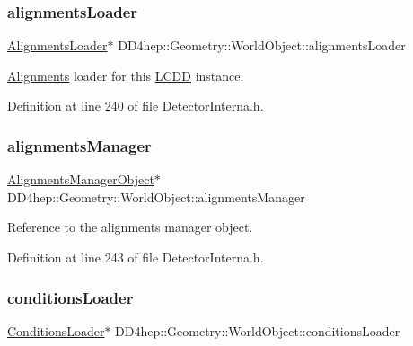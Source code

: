 \subsubsection{\texorpdfstring{alignments\+Loader}{alignmentsLoader}}
{\footnotesize\ttfamily \hyperlink{class_d_d4hep_1_1_geometry_1_1_world_object_a30113114fd4d57fb10e2c39c484813c3}{Alignments\+Loader}$\ast$ D\+D4hep\+::\+Geometry\+::\+World\+Object\+::alignments\+Loader}



\hyperlink{namespace_d_d4hep_1_1_alignments}{Alignments} loader for this \hyperlink{class_d_d4hep_1_1_geometry_1_1_l_c_d_d}{L\+C\+DD} instance. 



Definition at line 240 of file Detector\+Interna.\+h.

\hypertarget{class_d_d4hep_1_1_geometry_1_1_world_object_a4cd3b67817855becace65515c1df4240}{}\label{class_d_d4hep_1_1_geometry_1_1_world_object_a4cd3b67817855becace65515c1df4240} 
\subsubsection{\texorpdfstring{alignments\+Manager}{alignmentsManager}}
{\footnotesize\ttfamily \hyperlink{class_d_d4hep_1_1_geometry_1_1_world_object_ac5c3ed360e547df41b814ee0c5fddf9f}{Alignments\+Manager\+Object}$\ast$ D\+D4hep\+::\+Geometry\+::\+World\+Object\+::alignments\+Manager}



Reference to the alignments manager object. 



Definition at line 243 of file Detector\+Interna.\+h.

\hypertarget{class_d_d4hep_1_1_geometry_1_1_world_object_a9c6db420466092543b90e99e38a2727c}{}\label{class_d_d4hep_1_1_geometry_1_1_world_object_a9c6db420466092543b90e99e38a2727c} 
\subsubsection{\texorpdfstring{conditions\+Loader}{conditionsLoader}}
{\footnotesize\ttfamily \hyperlink{class_d_d4hep_1_1_geometry_1_1_world_object_ab3186f89db27a386504504645203d688}{Conditions\+Loader}$\ast$ D\+D4hep\+::\+Geometry\+::\+World\+Object\+::conditions\+Loader}



